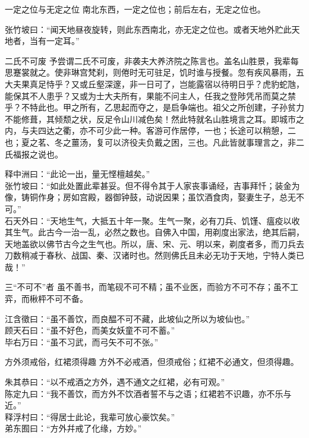 \begin{yulu}{一定之位与无定之位}
南北东西，一定之位也；前后左右，无定之位也。
\begin{comments}
张竹坡曰：“闻天地昼夜旋转，则此东西南北，亦无定之位也。或者天地外贮此天地者，当有一定耳。”
\end{comments}
\end{yulu}

\begin{yulu}{二氏不可废}
予尝谓二氏不可废，非袭夫大养济院之陈言也。盖名山胜景，我辈每思蹇裳就之。使非琳宫梵刹，则倦时无可驻足，饥时谁与授餐。忽有疾风暴雨，五大夫果真足恃乎？又或丘壑深邃，非一日可了，岂能露宿以待明日乎？虎豹蛇虺，能保其不人患乎？又或为士大夫所有，果能不问主人，任我之登陟凭吊而莫之禁乎？不特此也。甲之所有，乙思起而夺之，是启争端也。祖父之所创建，子孙贫力不能修葺，其倾颓之状，反足令山川减色矣！然此特就名山胜境言之耳。即城市之内，与夫四达之衢，亦不可少此一种。客游可作居停，一也；长途可以稍憩，二也；夏之茗、冬之薑汤，复可以济役夫负戴之困，三也。凡此皆就事理言之，非二氏福报之说也。
\begin{comments}
释中洲曰：“此论一出，量无悭檀越矣。” \\
张竹坡曰：“如此处置此辈甚妥。但不得令其于人家丧事诵经，吉事拜忏；装金为像，铸铜作身；房如宫殿，器御钟鼓，动说因果；虽饮酒食肉，娶妻生子，总无不可。” \\
石天外曰：“天地生气，大抵五十年一聚。生气一聚，必有刀兵、饥馑、瘟疫以收其生气。此古今一治一乱，必然之数也。自佛入中国，用剃度出家法，绝其后嗣，天地盖欲以佛节古今之生气也。所以，唐、宋、元、明以来，剃度者多，而刀兵去刀数稍减于春秋、战国、秦、汉诸时也。然则佛氏且未必无功于天地，宁特人类已哉！”
\end{comments}
\end{yulu}

\begin{yulu}{三“不可不”者}
虽不善书，而笔砚不可不精；虽不业医，而验方不可不存；虽不工弈，而楸枰不可不备。
\begin{comments}
江含徵曰：“虽不善饮，而良醖不可不藏，此坡仙之所以为坡仙也。” \\
顾天石曰：“虽不好色，而美女妖童不可不蓄。” \\
毕右万曰：“虽不习武，而弓矢不可不张。”
\end{comments}
\end{yulu}

\begin{yulu}{方外须戒俗，红裙须得趣}
方外不必戒酒，但须戒俗；红裙不必通文，但须得趣。
\begin{comments}
朱其恭曰：“以不戒酒之方外，遇不通文之红裙，必有可观。” \\
陈定九曰：“我不善饮，而方外不饮酒者誓不与之语；红裙若不识趣，亦不乐与近。” \\
释浮村曰：“得居士此论，我辈可放心豪饮矣。” \\
弟东囿曰：“方外幷戒了化缘，方妙。”
\end{comments}
\end{yulu}

